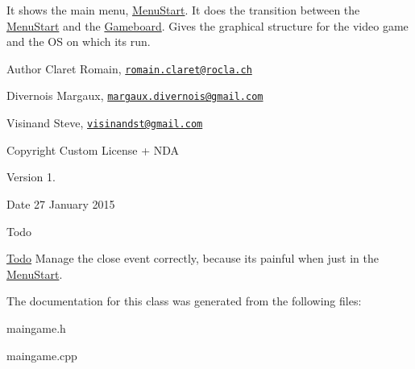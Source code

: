 It shows the main menu, \hyperlink{class_menu_start}{Menu\+Start}. It does the transition between the \hyperlink{class_menu_start}{Menu\+Start} and the \hyperlink{class_gameboard}{Gameboard}. Gives the graphical structure for the video game and the O\+S on which it\textquotesingle{}s run. \begin{DoxyAuthor}{Author}
Claret Romain, \href{mailto:romain.claret@rocla.ch}{\tt romain.\+claret@rocla.\+ch} 

Divernois Margaux, \href{mailto:margaux.divernois@gmail.com}{\tt margaux.\+divernois@gmail.\+com} 

Visinand Steve, \href{mailto:visinandst@gmail.com}{\tt visinandst@gmail.\+com} 
\end{DoxyAuthor}
\begin{DoxyCopyright}{Copyright}
Custom License + N\+D\+A 
\end{DoxyCopyright}
\begin{DoxyVersion}{Version}
1. 
\end{DoxyVersion}
\begin{DoxyDate}{Date}
27 January 2015 
\end{DoxyDate}
\begin{DoxyRefDesc}{Todo}
\item[\hyperlink{todo__todo000029}{Todo}]Manage the close event correctly, because it\textquotesingle{}s painful when just in the \hyperlink{class_menu_start}{Menu\+Start}. \end{DoxyRefDesc}


The documentation for this class was generated from the following files\+:\begin{DoxyCompactItemize}
\item 
maingame.\+h\item 
maingame.\+cpp\end{DoxyCompactItemize}
